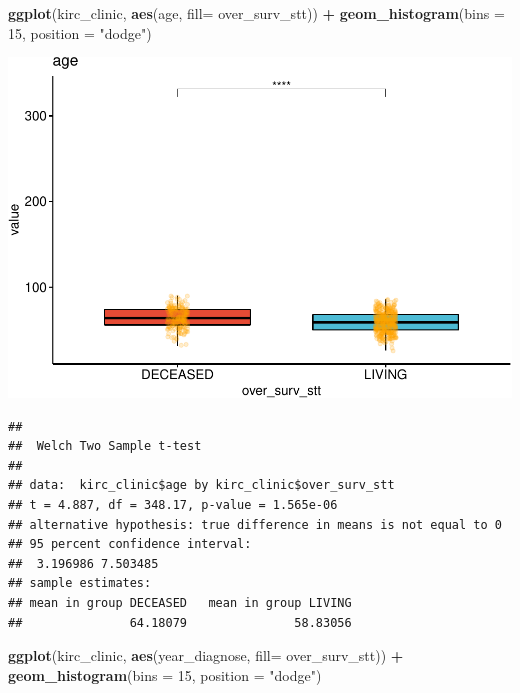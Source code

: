 \documentclass[]{article}
\newenvironment{Shaded}{\begin{snugshade}}{\end{snugshade}}
\newcommand{\KeywordTok}[1]{\textcolor[rgb]{0.13,0.29,0.53}{\textbf{#1}}}
\newcommand{\DataTypeTok}[1]{\textcolor[rgb]{0.13,0.29,0.53}{#1}}
\newcommand{\DecValTok}[1]{\textcolor[rgb]{0.00,0.00,0.81}{#1}}
\newcommand{\StringTok}[1]{\textcolor[rgb]{0.31,0.60,0.02}{#1}}
\newcommand{\OperatorTok}[1]{\textcolor[rgb]{0.81,0.36,0.00}{\textbf{#1}}}
\newcommand{\NormalTok}[1]{#1}
\begin{document}
\begin{Shaded}
\begin{Highlighting}[]
\KeywordTok{ggplot}\NormalTok{(kirc_clinic, }\KeywordTok{aes}\NormalTok{(age, }\DataTypeTok{fill=}\NormalTok{ over_surv_stt)) }\OperatorTok{+}
\StringTok{  }\KeywordTok{geom_histogram}\NormalTok{(}\DataTypeTok{bins =} \DecValTok{15}\NormalTok{, }\DataTypeTok{position =} \StringTok{"dodge"}\NormalTok{)}
\end{Highlighting}
\end{Shaded}

\includegraphics{figs/render-unnamed-chunk-12-1.pdf}

\begin{Shaded}
\end{Shaded}

\begin{verbatim}
## 
##  Welch Two Sample t-test
## 
## data:  kirc_clinic$age by kirc_clinic$over_surv_stt
## t = 4.887, df = 348.17, p-value = 1.565e-06
## alternative hypothesis: true difference in means is not equal to 0
## 95 percent confidence interval:
##  3.196986 7.503485
## sample estimates:
## mean in group DECEASED   mean in group LIVING 
##               64.18079               58.83056
\end{verbatim}

\begin{Shaded}
\begin{Highlighting}[]
\KeywordTok{ggplot}\NormalTok{(kirc_clinic, }\KeywordTok{aes}\NormalTok{(year_diagnose, }\DataTypeTok{fill=}\NormalTok{ over_surv_stt)) }\OperatorTok{+}
\StringTok{  }\KeywordTok{geom_histogram}\NormalTok{(}\DataTypeTok{bins =} \DecValTok{15}\NormalTok{, }\DataTypeTok{position =} \StringTok{"dodge"}\NormalTok{)}
\end{Highlighting}
\end{Shaded}
\end{document}
